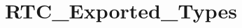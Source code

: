 \hypertarget{group___r_t_c___exported___types}{}\section{R\+T\+C\+\_\+\+Exported\+\_\+\+Types}
\label{group___r_t_c___exported___types}
